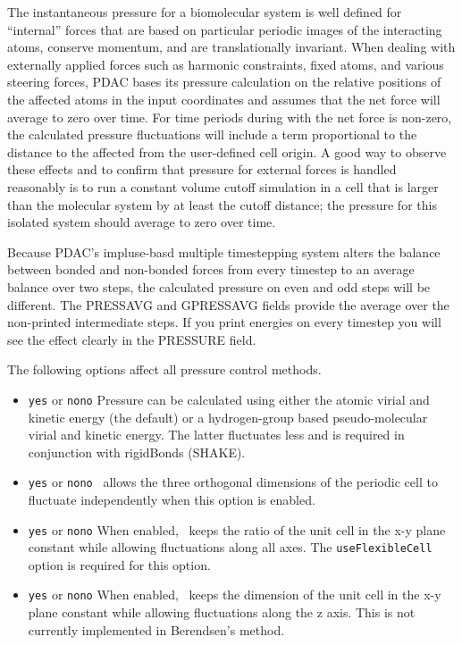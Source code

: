 The instantaneous pressure for a biomolecular system is well defined for
``internal'' forces that are based on particular periodic images of the
interacting atoms, conserve momentum, and are translationally invariant.
When dealing with externally applied forces such as harmonic constraints,
fixed atoms, and various steering forces, PDAC bases its pressure calculation
on the relative positions of the affected atoms in the input coordinates
and assumes that the net force will average to zero over time.  For time
periods during with the net force is non-zero, the calculated pressure
fluctuations will include a term proportional to the distance to the
affected from the user-defined cell origin.
A good way to observe these effects and to confirm that pressure for
external forces is handled reasonably is to run a constant volume cutoff
simulation in a cell that is larger than the molecular system by at least
the cutoff distance; the pressure for this isolated system should average
to zero over time.

Because PDAC's impluse-basd multiple timestepping system alters the
balance between bonded and non-bonded forces from every timestep to an
average balance over two steps, the calculated pressure on even and odd
steps will be different.  The PRESSAVG and GPRESSAVG fields provide the
average over the non-printed intermediate steps.  If you print energies on
every timestep you will see the effect clearly in the PRESSURE field.

The following options affect all pressure control methods.

\begin{itemize}

\item
{}
{{\tt yes} or {\tt no}}{{\tt no}}
{Pressure can be calculated using either the atomic virial and kinetic
energy (the default) or a hydrogen-group based pseudo-molecular
virial and kinetic energy.  The latter fluctuates less and is
required in conjunction with rigidBonds (SHAKE).}

\item
{}
{{\tt yes} or {\tt no}}{{\tt no}}
{\PDAC\ allows the three orthogonal dimensions of the periodic cell
to fluctuate independently when this option is enabled.}

\item
{}
{{\tt yes} or {\tt no}}{{\tt no}}
{When enabled, \PDAC\ keeps the ratio of the unit cell in the x-y plane 
constant while allowing fluctuations along all axes.  The {\tt useFlexibleCell} option is required for this option.}

\item
{}
{{\tt yes} or {\tt no}}{{\tt no}}
{When enabled, \PDAC\ keeps the dimension of the unit cell in the x-y plane 
constant while allowing fluctuations along the z axis.
This is not currently implemented in Berendsen's method.}

\end{itemize}

